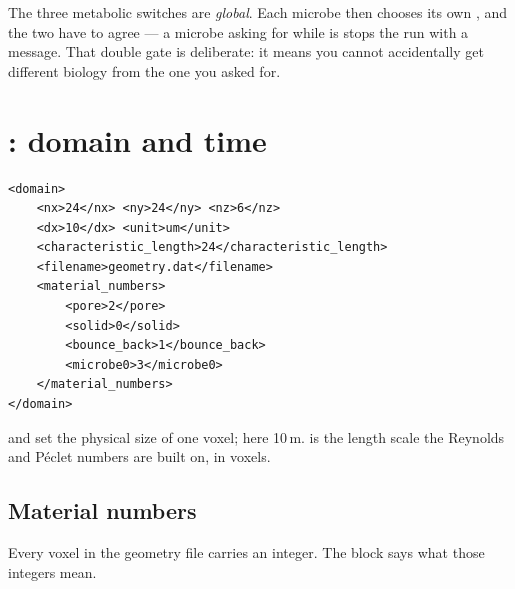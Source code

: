 The three metabolic switches are \emph{global}. Each microbe then chooses its
own , and the two have to agree --- a microbe asking for
 while  is  stops the run with a
message. That double gate is deliberate: it means you cannot accidentally get
different biology from the one you asked for.

\section{: domain and time}

\begin{lstlisting}[style=xml]
<domain>
    <nx>24</nx> <ny>24</ny> <nz>6</nz>
    <dx>10</dx> <unit>um</unit>
    <characteristic_length>24</characteristic_length>
    <filename>geometry.dat</filename>
    <material_numbers>
        <pore>2</pore>
        <solid>0</solid>
        <bounce_back>1</bounce_back>
        <microbe0>3</microbe0>
    </material_numbers>
</domain>
\end{lstlisting}

 and  set the physical size of one voxel; here 10\,\textmu m.
 is the length scale the Reynolds and P\'eclet
numbers are built on, in voxels.

\subsection{Material numbers}
\label{sec:materials}

Every voxel in the geometry file carries an integer. The
 block says what those integers mean.

